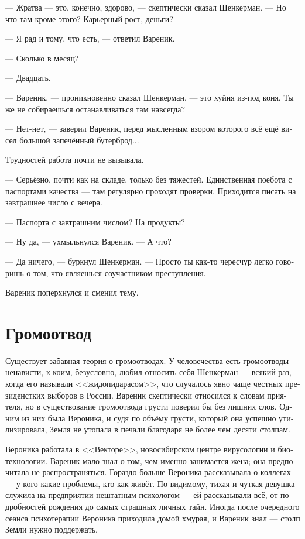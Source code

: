 \documentclass[a5paper,12pt,fleqn]{extbook}\usepackage{cooltooltips}\usepackage{polyglossia}\setdefaultlanguage[babelshorthands=true]{russian}\setotherlanguage{english}\defaultfontfeatures{Ligatures=TeX,Mapping=tex-text} \usepackage{xcolor}\definecolor{lightgray}{HTML}{bbbbbb}\color{lightgray}\newcommand{\ml}[3]{\textenglish{\textcolor{black}{#3}}}
\newcommand{\textspace}{\vspace{1em}{\centering\Large\bfseries<...>\par}\vspace{1em}}
\begin{document}
\textspace

--- Жратва --- это, конечно, здорово, --- скептически сказал Шенкерман.
--- Но что там кроме этого?
Карьерный рост, деньги?

--- Я рад и тому, что есть, --- ответил Вареник.

--- Сколько в месяц?

--- Двадцать.

--- Вареник, --- проникновенно сказал Шенкерман, --- это хуйня из-под коня.
Ты же не собираешься останавливаться там навсегда?

--- Нет-нет, --- заверил Вареник, перед мысленным взором которого всё ещё висел большой запечённый бутерброд...

Трудностей работа почти не вызывала.

--- Серьёзно, почти как на складе, только без тяжестей.
Единственная поебота с паспортами качества --- там регулярно проходят проверки.
Приходится писать на завтрашнее число с вечера.

--- Паспорта с завтрашним числом?
На продукты?

--- Ну да, --- ухмыльнулся Вареник.
--- А что?

--- Да ничего, --- буркнул Шенкерман.
--- Просто ты как-то чересчур легко говоришь о том, что являешься соучастником преступления.

Вареник поперхнулся и сменил тему.

\chapter{Громоотвод}

Существует забавная теория о громоотводах.
У человечества есть громоотводы ненависти, к коим, безусловно, любил относить себя Шенкерман --- всякий раз, когда его называли <<жидопидарасом>>, что случалось явно чаще честных президенстких выборов в России.
Вареник скептически относился к словам приятеля, но в существование громоотвода грусти поверил бы без лишних слов.
Одним из них была Вероника, и судя по объёму грусти, который она успешно утилизировала, Земля не утопала в печали благодаря не более чем десяти столпам.

Вероника работала в <<Векторе>>, новосибирском центре вирусологии и биотехнологии.
Вареник мало знал о том, чем именно занимается жена;
она предпочитала не распространяться.
Гораздо больше Вероника рассказывала о коллегах --- у кого какие проблемы, кто как живёт.
По-видимому, тихая и чуткая девушка служила на предприятии нештатным психологом --- ей рассказывали всё, от подробностей рождения до самых страшных личных тайн.
Иногда после очередного сеанса психотерапии Вероника приходила домой хмурая, и Вареник знал --- столп Земли нужно поддержать.
\end{document}
